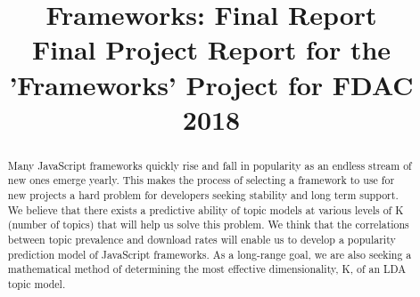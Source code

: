 \documentclass[conference]{IEEEtran}
\begin{document}
%

\title{Frameworks: Final Report\\
{\footnotesize Final Project Report for the 'Frameworks' Project for FDAC 2018 }
}

\author{
\and
{}
\and
{}
}

\maketitle

\begin{abstract}
Many JavaScript frameworks quickly rise and fall in popularity as an endless stream of new ones emerge yearly. This makes the process of selecting a framework to use for new projects a hard problem for developers seeking stability and long term support. We believe that there exists a predictive ability of topic models at various levels of K (number of topics) that will help us solve this problem. We think that the correlations between topic prevalence and download rates will enable us to develop a popularity prediction model of JavaScript frameworks. As a long-range goal, we are also seeking a mathematical method of determining the most effective dimensionality, K, of an LDA topic model.  
\end{abstract}
\end{document}
